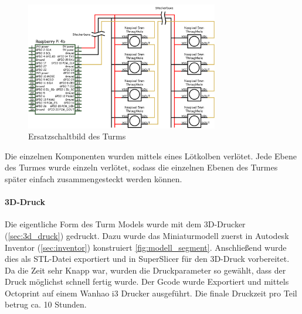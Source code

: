 \begin{figure}[H]
  \centering
  \includegraphics[width=0.75\textwidth]{images/tower_controller_v4_circuit_diagram.png}
  \caption{Ersatzschaltbild des Turms}
  \label{fig:ersatzschaltbild}
\end{figure}

Die einzelnen Komponenten wurden mittels eines Lötkolben verlötet. Jede Ebene des Turmes wurde einzeln verlötet, sodass die einzelnen Ebenen des Turmes später einfach zusammengesteckt werden können.

\paragraph{3D-Druck}

Die eigentliche Form des Turm Models wurde mit dem 3D-Drucker (\ref{sec:3d_druck}) gedruckt. Dazu wurde das Miniaturmodell zuerst in Autodesk Inventor (\ref{sec:inventor}) konstruiert \ref{fig:modell_segment}. Anschließend wurde dies als STL-Datei exportiert und in SuperSlicer für den 3D-Druck vorbereitet. Da die Zeit sehr Knapp war, wurden die Druckparameter so gewählt, dass der Druck möglichst schnell fertig wurde. Der Gcode wurde Exportiert und mittels Octoprint auf einem Wanhao i3 Drucker ausgeführt. Die finale Druckzeit pro Teil betrug ca. 10 Stunden.